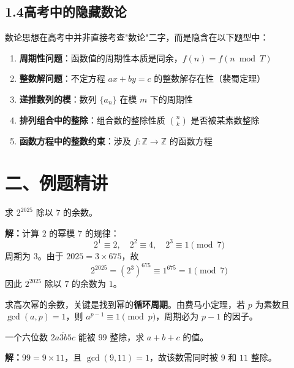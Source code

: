 \documentclass[12pt, a4paper]{ctexart}
\begin{document}
\subsection*{1.4\quad 高考中的隐藏数论}

\begin{knowledgebox}[高考中的数论影子]
数论思想在高考中并非直接考查"数论"二字，而是隐含在以下题型中：
\begin{enumerate}[label=(\arabic*)]
  \item \textbf{周期性问题}：函数值的周期性本质是同余，$f(n) = f(n \bmod T)$
  \item \textbf{整数解问题}：不定方程 $ax + by = c$ 的整数解存在性（裴蜀定理）
  \item \textbf{递推数列的模}：数列 $\{a_n\}$ 在模 $m$ 下的周期性
  \item \textbf{排列组合中的整除}：组合数的整除性质 $\binom{n}{k}$ 是否被某素数整除
  \item \textbf{函数方程中的整数约束}：涉及 $f:\mathbb{Z}\to\mathbb{Z}$ 的函数方程
\end{enumerate}
\end{knowledgebox}

\section*{\textcolor{examorange}{二、例题精讲}}

\begin{examplebox}
求 $2^{2025}$ 除以 $7$ 的余数。
\end{examplebox}

\textbf{解：}计算 $2$ 的幂模 $7$ 的规律：
\[ 2^1 \equiv 2,\quad 2^2 \equiv 4,\quad 2^3 \equiv 1 \pmod{7} \]
周期为 $3$。由于 $2025 = 3 \times 675$，故
\[ 2^{2025} = (2^3)^{675} \equiv 1^{675} = 1 \pmod{7} \]
因此 $2^{2025}$ 除以 $7$ 的余数为 $\boxed{1}$。

\begin{tipbox}[方法总结]
求高次幂的余数，关键是找到幂的\textbf{循环周期}。由费马小定理，若 $p$ 为素数且 $\gcd(a,p)=1$，则 $a^{p-1} \equiv 1 \pmod{p}$，周期必为 $p-1$ 的因子。
\end{tipbox}

\begin{examplebox}
一个六位数 $\overline{2a3b5c}$ 能被 $99$ 整除，求 $a + b + c$ 的值。
\end{examplebox}

\textbf{解：}$99 = 9 \times 11$，且 $\gcd(9, 11) = 1$，故该数需同时被 $9$ 和 $11$ 整除。
\end{document}
